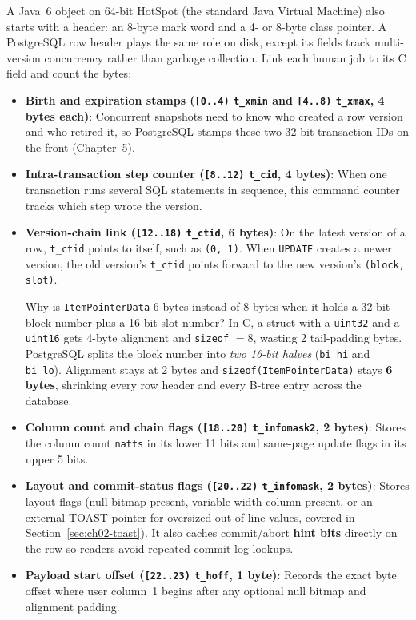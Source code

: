 A Java~6 object on 64-bit HotSpot (the standard Java Virtual Machine) also starts with a header: an 8-byte mark word and a 4- or 8-byte class pointer. A PostgreSQL row header plays the same role on disk, except its fields track multi-version concurrency rather than garbage collection. Link each human job to its C field and count the bytes:
\begin{itemize}
  \item \textbf{Birth and expiration stamps (\texttt{[0..4)} \texttt{t\_xmin} and \texttt{[4..8)} \texttt{t\_xmax}, 4 bytes each)}: Concurrent snapshots need to know who created a row version and who retired it, so PostgreSQL stamps these two 32-bit transaction IDs on the front (Chapter~5).
  \item \textbf{Intra-transaction step counter (\texttt{[8..12)} \texttt{t\_cid}, 4 bytes)}: When one transaction runs several SQL statements in sequence, this command counter tracks which step wrote the version.
  \item \textbf{Version-chain link (\texttt{[12..18)} \texttt{t\_ctid}, 6 bytes)}: On the latest version of a row, \texttt{t\_ctid} points to itself, such as \texttt{(0, 1)}. When \texttt{UPDATE} creates a newer version, the old version's \texttt{t\_ctid} points forward to the new version's \texttt{(block, slot)}.
  \begin{implementbox}
  Why is \texttt{ItemPointerData} 6 bytes instead of 8 bytes when it holds a 32-bit block number plus a 16-bit slot number? In C, a struct with a \texttt{uint32} and a \texttt{uint16} gets 4-byte alignment and \texttt{sizeof} $= 8$, wasting 2 tail-padding bytes. PostgreSQL splits the block number into \emph{two 16-bit halves} (\texttt{bi\_hi} and \texttt{bi\_lo}). Alignment stays at 2 bytes and \texttt{sizeof(ItemPointerData)} stays \textbf{6 bytes}, shrinking every row header and every B-tree entry across the database.
  \end{implementbox}
  \item \textbf{Column count and chain flags (\texttt{[18..20)} \texttt{t\_infomask2}, 2 bytes)}: Stores the column count \texttt{natts} in its lower 11 bits and same-page update flags in its upper 5 bits.
  \item \textbf{Layout and commit-status flags (\texttt{[20..22)} \texttt{t\_infomask}, 2 bytes)}: Stores layout flags (null bitmap present, variable-width column present, or an external TOAST pointer for oversized out-of-line values, covered in Section~\ref{sec:ch02-toast}). It also caches commit/abort \textbf{hint bits} directly on the row so readers avoid repeated commit-log lookups.
  \item \textbf{Payload start offset (\texttt{[22..23)} \texttt{t\_hoff}, 1 byte)}: Records the exact byte offset where user column~1 begins after any optional null bitmap and alignment padding.
\end{itemize}


